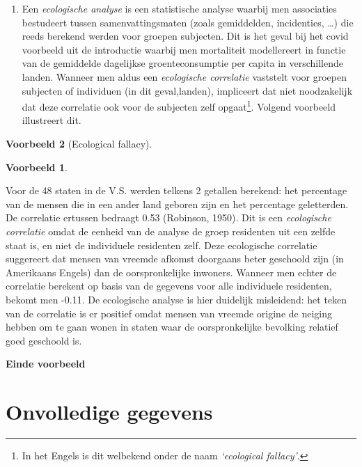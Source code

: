 \documentclass[
  12pt,dutch,coursenotes]{book}
\theoremstyle{definition}
\theoremstyle{definition}
\newtheorem{example}{Voorbeeld}[chapter]
\theoremstyle{definition}
\theoremstyle{remark}
\begin{document}
\begin{enumerate}
\item
  Een \emph{ecologische analyse} is een statistische analyse waarbij men associaties bestudeert tussen samenvattingsmaten (zoals gemiddelden, incidenties, \ldots) die reeds berekend werden voor groepen subjecten. Dit is het geval bij het covid voorbeeld uit de introductie waarbij men mortaliteit modellereert in functie van de gemiddelde dagelijkse groenteconsumptie per capita in verschillende landen. Wanneer men aldus een \emph{ecologische correlatie} vaststelt voor groepen subjecten of individuen (in dit geval,landen), impliceert dat niet noodzakelijk dat deze correlatie ook voor de subjecten zelf opgaat\footnote{In het Engels is dit welbekend onder de naam \emph{`ecological fallacy'}.}. Volgend voorbeeld illustreert dit.
\end{enumerate}

\begin{example}[Ecological fallacy]
\begin{example}

\protect\hypertarget{exm:unnamed-chunk-126}{}{\label{exm:unnamed-chunk-126} \iffalse (Ecological fallacy) \fi{} }

\end{example}
\end{example}

Voor de 48 staten in de V.S. werden telkens 2 getallen
berekend: het percentage van de mensen die in een ander land geboren zijn en het percentage geletterden. De correlatie ertussen bedraagt 0.53 (Robinson, 1950). Dit is een \emph{ecologische correlatie} omdat de eenheid van de analyse de groep residenten uit een zelfde staat is, en niet de individuele residenten zelf. Deze ecologische correlatie suggereert dat mensen van vreemde afkomst doorgaans beter geschoold zijn (in Amerikaans Engels) dan de oorspronkelijke inwoners. Wanneer men echter de correlatie berekent op basis
van de gegevens voor alle individuele residenten, bekomt men -0.11. De ecologische analyse is hier duidelijk misleidend: het teken van de correlatie is er positief omdat mensen van vreemde origine de neiging hebben om te gaan wonen in staten waar de oorspronkelijke bevolking relatief goed geschoold is.

\textbf{Einde voorbeeld}

\hypertarget{sec:missing}{%
\section{Onvolledige gegevens}\label{sec:missing}}
\end{document}
